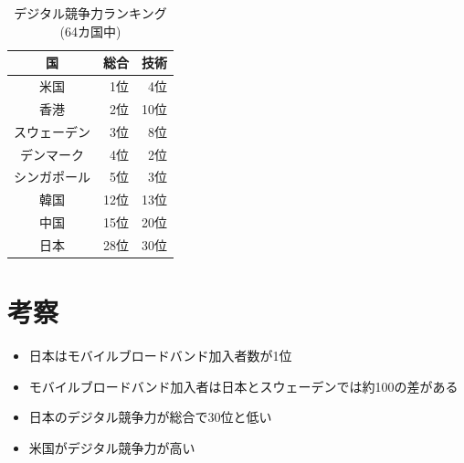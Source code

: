 \documentclass[a4paper,11pt,dvipdfmx]{ujarticle}
\begin{document}
\begin{table}[htbp]
    \centering
    \caption{デジタル競争力ランキング(64カ国中)}
    \label{tbl:デジタル}

    \begin{tabular}{|c|r|r|}\hline
        国 & 総合 & 技術 \\
        \hline
        米国 & 1位 & 4位 \\
        \hline
        香港 & 2位 & 10位 \\
        \hline
        スウェーデン & 3位 & 8位 \\
        \hline
        デンマーク & 4位 & 2位 \\
        \hline
        シンガポール & 5位 & 3位 \\
        \hline
        \hline
        韓国 & 12位 & 13位 \\
        \hline
        中国 & 15位 & 20位 \\
        \hline
        \hline
        日本 & 28位 & 30位 \\
        \hline
    \end{tabular}
\end{table}

\section{考察}

\begin{itemize}
    \item  日本はモバイルブロードバンド加入者数が1位
    \item  モバイルブロードバンド加入者は日本とスウェーデンでは約100の差がある
    \item  日本のデジタル競争力が総合で30位と低い
    \item  米国がデジタル競争力が高い
\end{itemize}



\end{document}
